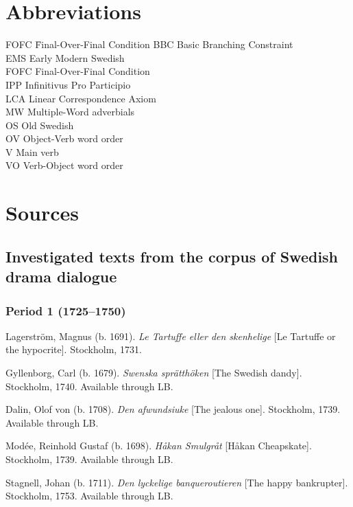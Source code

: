 \documentclass[output=paper, colorlinks, citecolor=brown]{langscibook}
\begin{document}
\section*{Abbreviations}
\begin{multicols}{2}
\begin{tabbing}
FOFC \hspace{.5ex} \= Final-Over-Final Condition\kill
BBC  \>   Basic Branching Constraint\\
EMS  \>   Early Modern Swedish\\
FOFC \>    Final-Over-Final Condition\\
IPP  \>   Infinitivus Pro Participio\\
LCA  \>   Linear Correspondence Axiom\\
MW   \>  Multiple-Word adverbials\\
OS   \>  Old Swedish\\
OV   \>  Object-Verb word order\\
V    \> Main verb\\
VO   \>  Verb-Object word order
\end{tabbing}
\end{multicols}

\section*{Sources}

\subsection*{Investigated texts from the corpus of Swedish drama dialogue }
\subsubsection*{Period 1 (1725--1750)}

\begin{description}[font=\normalfont]\sloppy
\item[1A:] Lagerström, Magnus (b. 1691). \textit{Le Tartuffe eller den skenhelige}  [Le Tartuffe or the hypocrite]. Stockholm, 1731. 
\item[1B:] Gyllenborg, Carl (b. 1679). \textit{Swenska sprätthöken} [The Swedish dandy]. Stockholm, 1740. Available through LB.
\item[1C:] Dalin, Olof von (b. 1708). \textit{Den afwundsiuke} [The jealous one]. Stockholm, 1739. Available through LB. 
\item[1D:] Modée, Reinhold Gustaf (b. 1698). \textit{Håkan Smulgråt} [Håkan Cheapskate]. Stockholm, 1739. Available through LB. 
\item[1E:] Stagnell, Johan (b. 1711). \textit{Den lyckelige banqueroutieren} [The happy bankrupter]. Stockholm, 1753. Available through LB.
\end{description}
\end{document}

